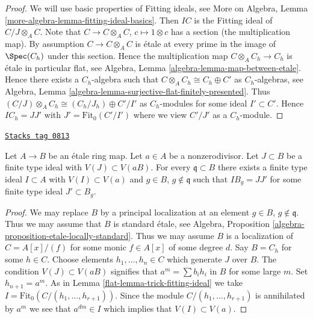 \begin{proof}
We will use basic properties of Fitting ideals, see
More on Algebra, Lemma \ref{more-algebra-lemma-fitting-ideal-basics}.
Then $IC$ is the Fitting ideal of $C/J \otimes_A C$.
Note that $C \to C \otimes_A C$, $c \mapsto 1 \otimes c$ has a section
(the multiplication map). By assumption $C \to C \otimes_A C$ is \'etale
at every prime in the image of $\Spec(C_h)$ under this section.
Hence the multiplication map $C \otimes_A C_h \to C_h$ is \'etale
in particular flat, see Algebra, Lemma \ref{algebra-lemma-map-between-etale}.
Hence there exists a $C_h$-algebra such that
$C \otimes_A C_h \cong C_h \oplus C'$ as $C_h$-algebras, see
Algebra, Lemma \ref{algebra-lemma-surjective-flat-finitely-presented}.
Thus $(C/J) \otimes_A C_h \cong (C_h/J_h) \oplus C'/I'$ as
$C_h$-modules for some ideal $I' \subset C'$.
Hence $IC_h = JJ'$ with $J' = \text{Fit}_0(C'/I')$ where we view
$C'/J'$ as a $C_h$-module.
\end{proof}

\begin{lemma}
\label{flat-lemma-push-ideal}
\href{https://stacks.math.columbia.edu/tag/0813}{\texttt{Stacks tag 0813}}

Let $A \to B$ be an \'etale ring map. Let $a \in A$ be a nonzerodivisor.
Let $J \subset B$ be a finite type ideal with $V(J) \subset V(aB)$.
For every $\mathfrak q \subset B$ there exists a finite type ideal
$I \subset A$ with $V(I) \subset V(a)$ and
$g \in B$, $g \not \in \mathfrak q$ such that
$IB_g = JJ'$ for some finite type ideal $J' \subset B_g$.
\end{lemma}

\begin{proof}

We may replace $B$ by a principal localization at
an element $g \in B$, $g \not \in \mathfrak q$. Thus we may assume
that $B$ is standard \'etale, see
Algebra, Proposition \ref{algebra-proposition-etale-locally-standard}.
Thus we may assume $B$ is a localization
of $C = A[x]/(f)$ for some monic $f \in A[x]$ of some degree $d$.
Say $B = C_h$ for some $h \in C$. Choose elements $h_1, \ldots, h_n \in C$
which generate $J$
over $B$. The condition $V(J) \subset V(aB)$ signifies that
$a^m = \sum b_i h_i$ in $B$ for some large $m$. Set $h_{n + 1} = a^m$.
As in Lemma \ref{flat-lemma-trick-fitting-ideal} we take
$I = \text{Fit}_0(C/(h_1, \ldots, h_{r + 1}))$.
Since the module $C/(h_1, \ldots, h_{r + 1})$
is annihilated by $a^m$ we see that $a^{dm} \in I$ which implies
that $V(I) \subset V(a)$.
\end{proof}


